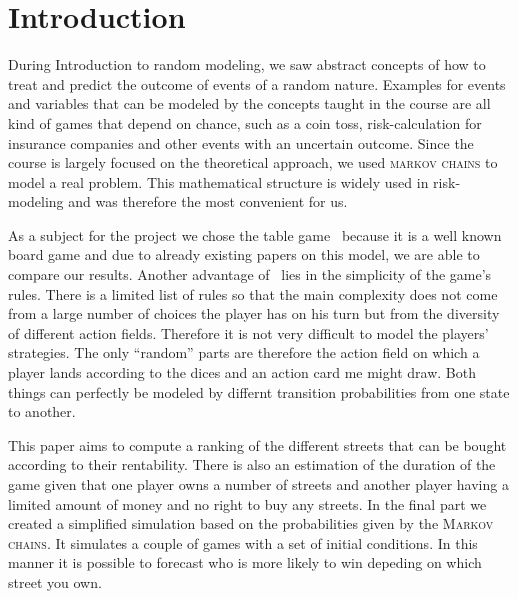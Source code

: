 \section{Introduction} %
\label{sec:introduction}

During Introduction to random modeling, we saw abstract concepts of how to treat and predict the 
outcome of events of a random nature. Examples for events and variables that can be modeled by the 
concepts taught in the course are all kind of games that depend on chance, such as a coin toss, 
risk-calculation for insurance companies and other events with an uncertain outcome. Since the course
is largely focused on the theoretical approach, we used \textsc{markov chains}	 to model 
a real problem. This mathematical structure is widely used in risk-modeling and was therefore the
most convenient for us. 

As a subject for the project we chose the table game \monopoly~because it is a well known board game and 
due to already existing papers on this model, we are able to compare our results. 
Another advantage of \monopoly~lies in the simplicity of the game's rules. 
There is a limited list of rules so that the main complexity does not come from a large number 
of choices the player has on his turn but from the diversity of different action fields. Therefore it is not
very difficult to model the players' strategies. 
The only ``random'' parts are therefore the action field on which a player lands according to the dices
and an action card me might draw. 
Both things can perfectly be modeled by differnt transition probabilities from one state to another.

This paper aims to compute a ranking of the different streets that can be bought according to their rentability. 
There is also an estimation of the duration of the game given that one player owns a number
of streets and another player having a limited amount of money and no right to buy any streets.
In the final part we created a simplified simulation based on the probabilities given by the \textsc{Markov chains}.
It simulates a couple of games with a set of initial conditions. In this manner it is possible to forecast
who is more likely to win depeding on which street you own.

